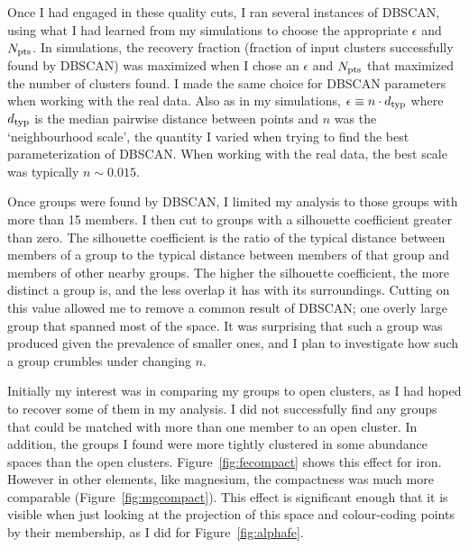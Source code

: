 \documentclass[11pt]{article}
\begin{document}
Once I had engaged in these quality cuts, I ran several instances of DBSCAN, using what I had learned from my simulations to choose the appropriate $\epsilon$ and $N_{\rm pts}$. In simulations, the recovery fraction (fraction of input clusters successfully found by DBSCAN) was maximized when I chose an $\epsilon$ and $N_{\rm pts}$ that maximized the number of clusters found. I made the same choice for DBSCAN parameters when working with the real data. Also as in my simulations, $\epsilon\equiv n\cdot d_{\rm typ}$ where $d_{\rm typ}$ is the median pairwise distance between points and $n$ was the `neighbourhood scale', the quantity I varied when trying to find the best parameterization of DBSCAN. When working with the real data, the best scale was typically $n\sim0.015$.

Once groups were found by DBSCAN, I limited my analysis to those groups with more than 15 members. I then cut to groups with a silhouette coefficient greater than zero. The silhouette coefficient is the ratio of the typical distance between members of a group to the typical distance between members of that group and members of other nearby groups. The higher the silhouette coefficient, the more distinct a group is, and the less overlap it has with its surroundings. Cutting on this value allowed me to remove a common result of DBSCAN; one overly large group that spanned most of the space. It was surprising that such a group was produced given the prevalence of smaller ones, and I plan to investigate how such a group crumbles under changing $n$.

Initially my interest was in comparing my groups to open clusters, as I had hoped to recover some of them in my analysis. I did not successfully find any groups that could be matched with more than one member to an open cluster. In addition, the groups I found were more tightly clustered in some abundance spaces than the open clusters. Figure~\ref{fig:fecompact} shows this effect for iron. However in other elements, like magnesium, the compactness was much more comparable (Figure~\ref{fig:mgcompact}). This effect is significant enough that it is visible when just looking at the projection of this space and colour-coding points by their membership, as I did for Figure~\ref{fig:alphafe}.
\end{document}
